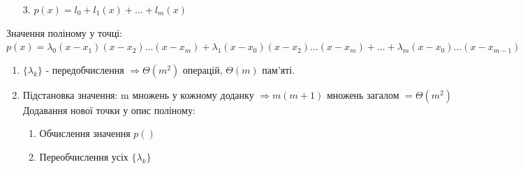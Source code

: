 \documentclass[a4paper,12pt]{article}
\begin{document}
\newpage
    \begin{enumerate}
        \item[3.] $p(x)=l_0+l_1(x)+...+l_m(x)$
    \end{enumerate}
    Значення поліному у точці: \\
    $p(x)=\lambda_0(x-x_1)(x-x_2)...(x-x_m)+\lambda_1(x-x_0)(x-x_2)...(x-x_m)+...+\lambda_m(x-x_0)...(x-x_{m-1})$
    \begin{enumerate}
        \item $\{\lambda_k\}$ - передобчислення $\Rightarrow\Theta(m^2)$ операцій, $\Theta(m)$ пам'яті.
        \item Підстановка значення: m множень у кожному доданку $\Rightarrow m(m+1)$ множень загалом $=\Theta(m^2)$ \\
        Додавання нової точки у опис поліному:
        \begin{enumerate}
            \item Обчислення значення $p()$
            \item Переобчислення усіх $\{\lambda_k\}$
        \end{enumerate}
    \end{enumerate}
\end{document}
